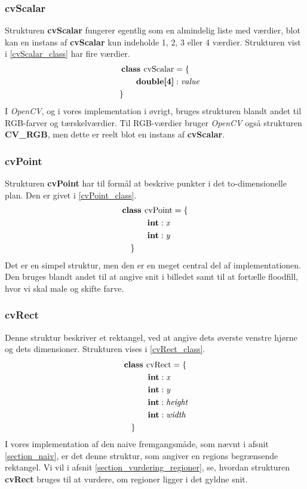 {\subsubsection{cvScalar}
Strukturen \textbf{cvScalar} fungerer egentlig som en almindelig liste
med værdier, blot kan en instans af \textbf{cvScalar} kun indeholde 1,
2, 3 eller 4 værdier. Strukturen vist i \eqref{cvScalar_class} har fire
værdier.
\begin{multline}
    \textbf{class~} \textrm{cvScalar} = \{ \\
    \shoveleft{\qquad\textbf{double[4]} : \textit{value}} \\
    \shoveleft{\}}\shoveright{}
    \label{cvScalar_class}
\end{multline}
I \emph{OpenCV}, og i vores implementation i øvrigt, bruges strukturen
blandt andet til RGB-farver og tærskelværdier. Til RGB-værdier bruger
\emph{OpenCV} også strukturen \textbf{CV\_RGB}, men dette er reelt blot
en instans af \textbf{cvScalar}.

\subsubsection{cvPoint}
Strukturen \textbf{cvPoint} har til formål at beskrive punkter i det
to-dimensionelle plan. Den er givet i \eqref{cvPoint_class}.
\begin{multline}
    \textbf{class~} \textrm{cvPoint} = \{ \\
    \shoveleft{\qquad\textbf{int} : \textit{x}} \\
    \shoveleft{\qquad\textbf{int} : \textit{y}} \\
    \shoveleft{\}}\shoveright{}
    \label{cvPoint_class}
\end{multline}
Det er en simpel struktur, men den er en meget central del af
implementationen.  Den bruges blandt andet til at angive snit i billedet
samt til at fortælle floodfill, hvor vi skal male og skifte farve.

\subsubsection{cvRect}
Denne struktur beskriver et rektangel, ved at angive dets øverste venstre
hjørne og dets dimensioner. Strukturen vises i \eqref{cvRect_class}.
\begin{multline}
    \textbf{class~} \textrm{cvRect} = \{ \\
    \shoveleft{\qquad\textbf{int} : \textit{x}} \\
    \shoveleft{\qquad\textbf{int} : \textit{y}} \\
    \shoveleft{\qquad\textbf{int} : \textit{height}} \\
    \shoveleft{\qquad\textbf{int} : \textit{width}} \\
    \shoveleft{\}}\shoveright{}
    \label{cvRect_class}
\end{multline}
I vores implementation af den naive fremgangsmåde, som nævnt i afsnit
\ref{section_naiv}, er det denne struktur, som angiver en regions
begrænsende rektangel. Vi vil i afsnit \ref{section_vurdering_regioner},
se, hvordan strukturen \textbf{cvRect} bruges til at vurdere, om regioner
ligger i det gyldne snit.

}
